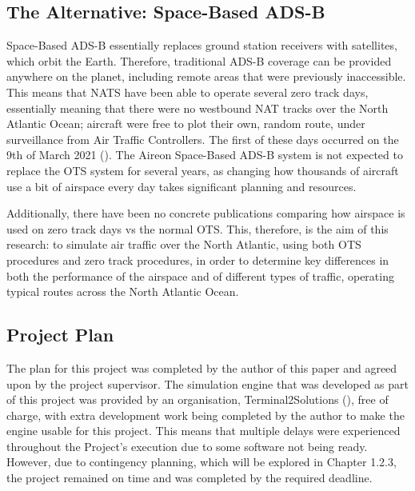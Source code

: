 \documentclass[stu, a4paper, 12pt, floatsintext]{apa7}
\numberwithin{figure}{section}
\numberwithin{table}{section}
\numberwithin{equation}{section}
\begin{document}
\subsection{The Alternative: Space-Based ADS-B}
Space-Based ADS-B essentially replaces ground station receivers with satellites, which orbit the Earth. Therefore, traditional ADS-B coverage can be provided anywhere on the planet, including remote areas that were previously inaccessible. This means that NATS have been able to operate several zero track days, essentially meaning that there were no westbound NAT tracks over the North Atlantic Ocean; aircraft were free to plot their own, random route, under surveillance from Air Traffic Controllers. The first of these days occurred on the 9th of March 2021 (\cite{Young2021}). The Aireon Space-Based ADS-B system is not expected to replace the OTS system for several years, as changing how thousands of aircraft use a bit of airspace every day takes significant planning and resources.

Additionally, there have been no concrete publications comparing how airspace is used on zero track days vs the normal OTS. This, therefore, is the aim of this research: to simulate air traffic over the North Atlantic, using both OTS procedures and zero track procedures, in order to determine key differences in both the performance of the airspace and of different types of traffic, operating typical routes across the North Atlantic Ocean. 
\subsection{Project Plan}
The plan for this project was completed by the author of this paper and agreed upon by the project supervisor. The simulation engine that was developed as part of this project was provided by an organisation, Terminal2Solutions (\cite{T2}), free of charge, with extra development work being completed by the author to make the engine usable for this project. This means that multiple delays were experienced throughout the Project’s execution due to some software not being ready. However, due to contingency planning, which will be explored in Chapter 1.2.3, the project remained on time and was completed by the required deadline.
\end{document}
